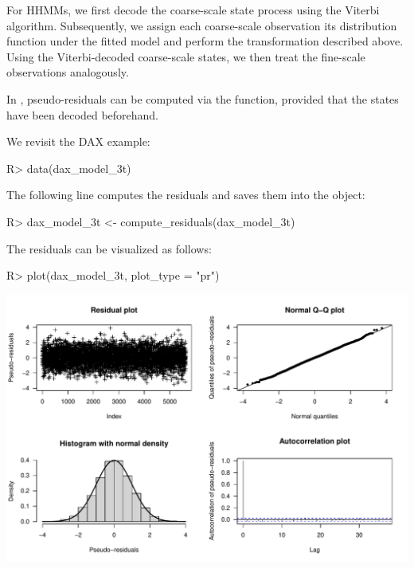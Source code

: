 \documentclass[article]{jss}
\newcommand{\fct}[1]{\code{#1()}}
\begin{document}
For HHMMs, we first decode the coarse-scale state process using the Viterbi algorithm. Subsequently, we assign each coarse-scale observation its distribution function under the fitted model and perform the transformation described above. Using the Viterbi-decoded coarse-scale states, we then treat the fine-scale observations analogously.

In , pseudo-residuals can be computed via the \fct{compute\_residuals} function, provided that the states have been decoded beforehand.

We revisit the DAX example:

%
\begin{Schunk}
\begin{Sinput}
R> data(dax_model_3t)
\end{Sinput}
\end{Schunk}
%

The following line computes the residuals and saves them into the  object:

%
\begin{Schunk}
\begin{Sinput}
R> dax_model_3t <- compute_residuals(dax_model_3t)
\end{Sinput}
\end{Schunk}
%

The residuals can be visualized as follows:

%
\begin{Schunk}
\begin{Sinput}
R> plot(dax_model_3t, plot_type = "pr")
\end{Sinput}
\end{Schunk}
\includegraphics{fhmm_oelschlaeger_adam_michels-residuals}
%
\end{document}
